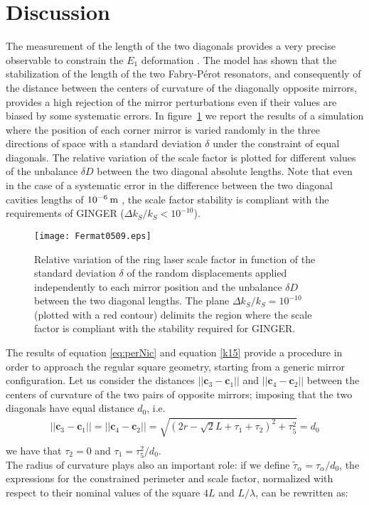 \documentclass[12pt,a4paper,final]{iopart}
\begin{document}
\section{Discussion} 
The measurement of the length of the two diagonals provides a very precise observable to constrain the $E_1$ deformation \cite{CQG}. The model has shown that the stabilization of the length of the two Fabry-P\'{e}rot resonators, and consequently of the distance between the centers of curvature of the diagonally opposite mirrors, provides a high rejection of the mirror perturbations even if their values are biased by some systematic errors. In figure~\ref{fig:3}
we report the results of a  simulation where the position of each corner mirror is varied randomly in the three directions of space 
with a standard deviation $\delta$ under the constraint of equal diagonals. 
The relative variation of the scale factor is plotted for different values of the unbalance $\delta D$ between the two diagonal absolute lengths.
Note that even in the case of a systematic error in the difference between the two diagonal cavities lengths of $10^{-6}\, \rm{m}$ \cite{CQG}, the scale factor stability is compliant with the requirements
of GINGER ($\Delta k_{S}/k{_{S}}<10^{-10}$).

\begin{figure}[h!!!]
\centerline{\texttt{[image: Fermat0509.eps]}}
\caption{\label{fig:3}Relative variation of the ring laser scale factor in function of the standard deviation $\delta$ of the random displacements applied independently to each mirror position and the unbalance $\delta D$ between the two diagonal lengths. The plane $\Delta k_{S}/k{_{S}}=10^{-10}  $ (plotted with a red contour) delimits the region where the scale factor is compliant with the stability required for GINGER.}
\end{figure}
 The results of equation \ref{eq:perNic} and equation \ref{k15} provide a procedure in order to approach the regular square geometry, starting from a generic mirror configuration. Let us consider  the distances $||\mathbf{c}_3-\mathbf{c}_1||$ and $||\mathbf{c}_4-\mathbf{c}_2||$ between the centers of curvature of the two pairs of opposite mirrors; imposing that the two diagonals have equal distance $d_0$, i.e.  
\begin{eqnarray}
||\mathbf{c}_3-\mathbf{c}_1||=||\mathbf{c}_4-\mathbf{c}_2||=\sqrt{(2r-\sqrt{2}L+\tau_1+\tau_2)^2+\tau_5^2}=d_0 \nonumber\\
\end{eqnarray}
we have  that $\tau_2=0$ and $\tau_1={\tau_5^2}/d_0$. \\
The radius of curvature plays also an important role: if we define $\widetilde \tau_{\alpha}=\tau_{\alpha}/d_0$, the expressions for the constrained perimeter and 
scale factor, normalized with respect to their nominal values of the square $ 4L $ and $L/\lambda $, can be rewritten as:
\end{document}
